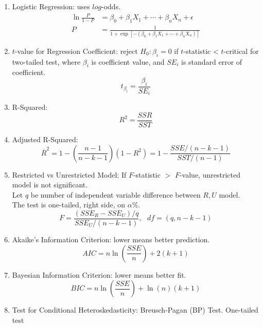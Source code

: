 \begin{enumerate}[label=\roman*.]
\setlength{\itemsep}{0pt}
\item Logistic Regression: uses $log$-odds.
\begin{align}
\ln \frac{P}{1-P} &= \beta_0 + \beta_1 X_1 + \cdots + \beta_n X_n + \epsilon \nonumber \\
P &= \frac{1}{1 + \exp[-(\beta_0 + \beta_1 X_1 + \cdots + \beta_n X_n)]} \nonumber
\end{align}
\item $t$-value for Regression Coefficient: reject $H_0: \beta_i = 0$ if $t$-statistic < $t$-critical for two-tailed test, where $\beta_i$ is coefficient value, and $SE_i$ is standard error of coefficient.
\begin{equation}
t_{\beta_i} = \frac{\beta_i}{SE_i} \nonumber
\end{equation}
\item R-Squared: 
\begin{equation}
R^2 = \frac{SSR}{SST} \nonumber
\end{equation}
\item Adjusted R-Squared:
\begin{equation}
\overline{R}^2 = 1 - \left( \frac{n-1}{n-k-1} \right)(1-R^2) = 1 - \frac{SSE / (n-k-1)}{SST/(n-1)} \nonumber
\end{equation}
\item Restricted vs Unrestricted Model: If $F$-statistic $>$ $F$-value, unrestricted model is not significant.\\
Let $q$ be number of independent variable difference between $R, U$ model.\\
The test is one-tailed, right side, on $\alpha \%$.
\begin{equation}
F = \frac{(SSE_R - SSE_U)/q}{SSE_U/(n-k-1)}, \ \ \ df = (q, n-k-1) \nonumber
\end{equation}
\item Akaike's Information Criterion: lower means better prediction.
\begin{equation}
AIC = n \ln \left( \frac{SSE}{n} \right) + 2 (k+1) \nonumber
\end{equation}
\item Bayesian Information Criterion: lower means better fit.
\begin{equation}
BIC = n \ln \left( \frac{SSE}{n} \right) + \ln (n) (k+1) \nonumber
\end{equation}
\item Test for Conditional Heteroskedasticity: Breusch-Pagan (BP) Test. One-tailed test\\

\end{enumerate}

